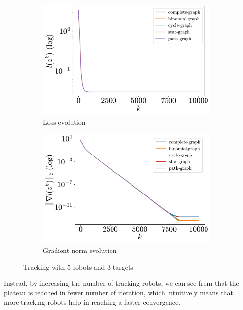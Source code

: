 \documentclass[a4paper,11pt,oneside]{book}
\begin{document}
\begin{figure}[H]
      \centering
      \begin{subfigure}[t]{0.46\linewidth}
            \centering
            \includegraphics[width=\linewidth]{./figs/tracking/5_3_2/loss.pdf} 
            \caption{Loss evolution}
      \end{subfigure}
      \hfill
      \begin{subfigure}[t]{0.46\linewidth}
            \centering
            \includegraphics[width=\linewidth]{./figs/tracking/5_3_2/gradient.pdf} 
            \caption{Gradient norm evolution}
      \end{subfigure}
      \caption{Tracking with $5$ robots and $3$ targets}
      \label{fig:tracking_5_3}
\end{figure}

Instead, by increasing the number of tracking robots, we can see from  that the plateau is reached in fewer number of iteration, which intuitively means that more tracking robots help in reaching a faster convergence.
\end{document}
